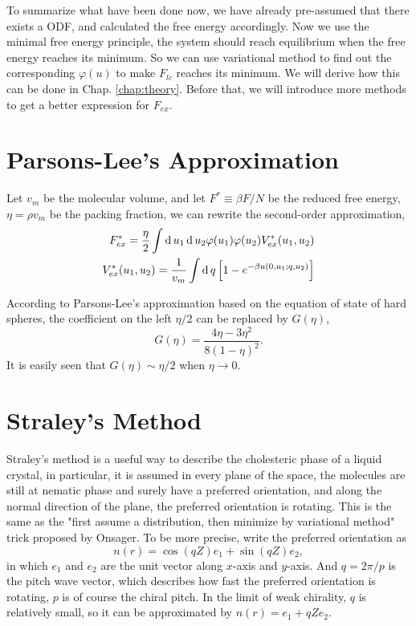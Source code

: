 To summarize what have been done now, we have already pre-assumed that there exists a ODF, and calculated the free energy accordingly. Now we use the minimal free energy principle, the system should reach equilibrium when the free energy reaches its minimum. So we can use variational method to find out the corresponding $\varphi(u)$ to make $F_{lc}$ reaches its minimum. We will derive how this can be done in Chap. \ref{chap:theory}. Before that, we will introduce more methods to get a better expression for $F_{ex}$.

\section{Parsons-Lee's Approximation}
Let $v_m$ be the molecular volume, and let $F^*\equiv\beta F/N$ be the reduced free energy, $\eta = \rho v_m$ be the packing fraction, we can rewrite the second-order approximation,
\begin{equation}
	\begin{split}
		F_{ex}^* = \frac{\eta}{2}\int \operatorname{d}u_1\operatorname{d}u_2\varphi(u_1)\varphi(u_2)V_{ex}^*(u_1,u_2)\\
		V_{ex}^*(u_1,u_2) = \frac{1}{v_m}\int\operatorname{d}q\left[1-e^{-\beta u(0,u_1;q,u_2)}\right]
	\end{split}
\end{equation}

According to Parsons-Lee's approximation based on the equation of state of hard spheres, the coefficient on the left $\eta/2$ can be replaced by $G(\eta)$,
\begin{equation}
	G(\eta)=\dfrac{4\eta-3\eta^2}{8(1-\eta)^2}.
\end{equation}
It is easily seen that $G(\eta)\sim\eta/2$ when $\eta\rightarrow 0$.


\section{Straley's Method}
Straley's method is a useful way to describe the cholesteric phase of a liquid crystal, in particular, it is assumed in every plane of the space, the molecules are still at nematic phase and surely have a preferred orientation, and along the normal direction of the plane, the preferred orientation is rotating. This is the same as the "first assume a distribution, then minimize by variational method" trick proposed by Onsager. To be more precise, write the preferred orientation as
\begin{equation}
	n(r)=\cos(qZ)e_1 + \sin(qZ)e_2,
\end{equation}
in which $e_1$ and $e_2$ are the unit vector along $x$-axis and $y$-axis. And $q=2\pi/p$ is the pitch wave vector, which describes how fast the preferred orientation is rotating, $p$ is of course the chiral pitch. In the limit of weak chirality, $q$ is relatively small, so it can be approximated by $n(r)=e_1+qZe_2$.

